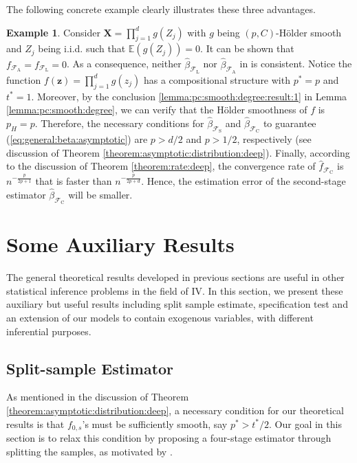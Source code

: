\documentclass[11pt, preprint]{imsart}
\numberwithin{equation}{section}
\def \mcF{\mathcal{F}}
\def \bfX{\mathbf{X}}
\def \bfz{\mathbf{z}}
\def \bfd{\mathbf{d}}
\def \bft{\mathbf{t}}
\def \bfp{\mathbf{p}}
\def \ev{\mathbb{E}}
\def \bft{\mathbf{t}}
\theoremstyle{plain}
\theoremstyle{definition}
\newtheorem{Example}{Example}
\begin{document}
The following concrete example clearly illustrates these three advantages.
\begin{Example}\label{example:5}
Consider $\bfX=\prod_{j=1}^dg(Z_j)$ with $g$ being $(p, C)$-H\" older smooth and $Z_j$ being i.i.d. such that $\ev(g(Z_j))=0$. It can be shown that $f_{\mcF_{\textrm{A}}}=f_{\mcF_{\textrm{L}}}=0$. As a consequence, neither $\widehat{\beta}_{\mcF_{\textrm{L}}}$ nor $\widehat{\beta}_{\mcF_{\textrm{A}}}$ in \cite{fz18} is consistent. Notice  the function $f(\bfz)=\prod_{j=1}^dg(z_j)$  has a compositional  structure with $p^*=p$ and $t^*=1$. Moreover, by the conclusion \ref{lemma:pc:smooth:degree:result:1} in Lemma \ref{lemma:pc:smooth:degree},  we can verify  that the H\" older smoothness of $f$ is $p_H=p$. Therefore, the necessary conditions for $\widehat{\beta}_{\mcF_\textrm{S}}$ and $\widehat{\beta}_{\mcF_\textrm{C}}$ to guarantee (\ref{eq:general:beta:asymptotic}) are $p>d/2$ and $p>1/2$, respectively (see discussion of Theorem \ref{theorem:asymptotic:distribution:deep}). Finally, according to the discussion of Theorem \ref{theorem:rate:deep}, the convergence rate of $\widehat{f}_{\mcF_\textrm{C}}$ is $n^{-\frac{p}{2p+1}}$ that is faster than $n^{-\frac{p}{2p+d}}$. Hence, the estimation error of the second-stage estimator $\widehat{\beta}_{\mcF_\textrm{C}}$ will be smaller.
\end{Example}


\section{Some Auxiliary Results}\label{sec:extra:results}

The general theoretical results developed in previous sections are useful in other statistical inference problems in the field of IV. In this section, we present these auxiliary but useful results including split sample estimate, specification test and an extension of our models to contain exogenous variables, with different inferential purposes.

\subsection{Split-sample Estimator}
As mentioned in the discussion of Theorem \ref{theorem:asymptotic:distribution:deep}, a necessary condition for our theoretical results is that $f_{0,s}$'s must be sufficiently smooth, say $p^*>t^*/2$. Our goal in this section is to relax this condition by proposing a four-stage estimator through splitting the samples, as motivated by \cite{ak95, bcch12}.
\end{document}
